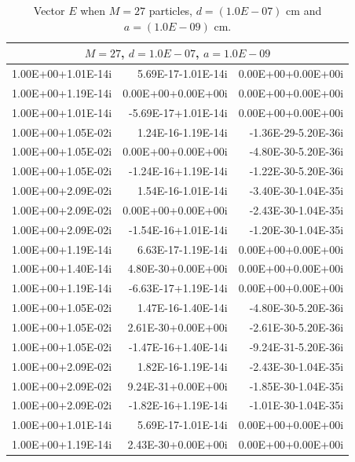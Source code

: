 \documentclass[12pt]{article}
\numberwithin{equation}{section}
\begin{document}
\begin{table}[htbp]
  \centering
  \caption{Vector $E$ when $M=27$ particles, $d=(1.0E-07)$ cm and $a=(1.0E-09)$ cm.}
    \begin{tabular}{rrr}
       \toprule
       		\multicolumn{3}{c}{$M=27$, $d=1.0E-07$, $a=1.0E-09$}\\
       \midrule
			1.00E+00+1.01E-14i &  5.69E-17-1.01E-14i &  0.00E+00+0.00E+00i \\
		    1.00E+00+1.19E-14i &  0.00E+00+0.00E+00i &  0.00E+00+0.00E+00i \\
		    1.00E+00+1.01E-14i &  -5.69E-17+1.01E-14i &  0.00E+00+0.00E+00i \\
		    1.00E+00+1.05E-02i &  1.24E-16-1.19E-14i &  -1.36E-29-5.20E-36i \\
		    1.00E+00+1.05E-02i &  0.00E+00+0.00E+00i &  -4.80E-30-5.20E-36i \\
		    1.00E+00+1.05E-02i &  -1.24E-16+1.19E-14i &  -1.22E-30-5.20E-36i \\
		    1.00E+00+2.09E-02i &  1.54E-16-1.01E-14i &  -3.40E-30-1.04E-35i \\
		    1.00E+00+2.09E-02i &  0.00E+00+0.00E+00i &  -2.43E-30-1.04E-35i \\
		    1.00E+00+2.09E-02i &  -1.54E-16+1.01E-14i &  -1.20E-30-1.04E-35i \\
		    1.00E+00+1.19E-14i &  6.63E-17-1.19E-14i &  0.00E+00+0.00E+00i \\
		    1.00E+00+1.40E-14i &  4.80E-30+0.00E+00i &  0.00E+00+0.00E+00i \\
		    1.00E+00+1.19E-14i &  -6.63E-17+1.19E-14i &  0.00E+00+0.00E+00i \\
		    1.00E+00+1.05E-02i &  1.47E-16-1.40E-14i &  -4.80E-30-5.20E-36i \\
		    1.00E+00+1.05E-02i &  2.61E-30+0.00E+00i &  -2.61E-30-5.20E-36i \\
		    1.00E+00+1.05E-02i &  -1.47E-16+1.40E-14i &  -9.24E-31-5.20E-36i \\
		    1.00E+00+2.09E-02i &  1.82E-16-1.19E-14i &  -2.43E-30-1.04E-35i \\
		    1.00E+00+2.09E-02i &  9.24E-31+0.00E+00i &  -1.85E-30-1.04E-35i \\
		    1.00E+00+2.09E-02i &  -1.82E-16+1.19E-14i &  -1.01E-30-1.04E-35i \\
		    1.00E+00+1.01E-14i &  5.69E-17-1.01E-14i &  0.00E+00+0.00E+00i \\
		    1.00E+00+1.19E-14i &  2.43E-30+0.00E+00i &  0.00E+00+0.00E+00i \\

\end{tabular}
\end{table}
\end{document}
